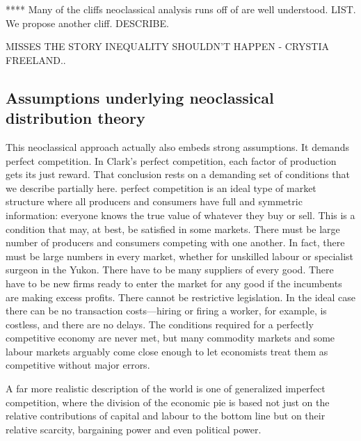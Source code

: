 **** Many of the cliffs neoclassical analysis runs off of are well understood. LIST. We propose another cliff. DESCRIBE.

MISSES THE STORY INEQUALITY SHOULDN'T HAPPEN - CRYSTIA FREELAND..

\subsection{Assumptions underlying neoclassical distribution theory}
This neoclassical approach actually also embeds strong assumptions.  It demands perfect competition. 
 In Clark's  perfect competition, %
each \gls{factor of production} gets its just reward. That conclusion rests on a demanding set of conditions that we  describe partially here. \Gls{perfect competition} is an ideal type of market structure where all producers and consumers have full and symmetric information: everyone knows the true value of whatever they buy or sell.  This is a condition that may, at best, be satisfied in some markets. There must be large number of producers and consumers competing with one another. In fact, there must be large numbers in every market, whether for unskilled labour or specialist surgeon in the Yukon.  There have to be many suppliers of every good. %
There have to be new firms ready to enter the market  for any good  if the incumbents are making excess profits. There cannot be restrictive legislation. In the ideal case there can be no transaction costs---hiring or firing a worker, for example, is costless,  and there are no delays. The conditions required for a perfectly competitive economy are never met, but many commodity markets and some labour markets arguably come close enough to let economists treat them as competitive without major errors. 

 A far more realistic description of the world is one of generalized  \gls{imperfect competition}, where the division of the economic pie is based not just on the relative contributions of capital and labour to the bottom line but on their relative \gls{scarcity}, bargaining power and even political power.  %



